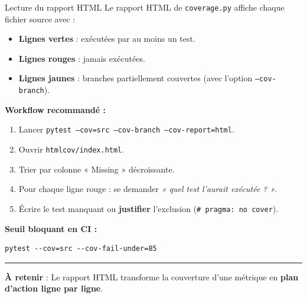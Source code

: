 \documentclass[aspectratio=169,11pt]{beamer}
\newcommand{\takeaway}[1]{%
\vfill\begin{beamercolorbox}[wd=\linewidth,sep=0.4em]{}
\color{accent2}\rule[0.6ex]{1.2em}{1.2pt}\hspace{0.4em}%
\textbf{\color{accent2}\small À retenir} \textcolor{textsoft}{:} %
{\small\color{textmain}#1}
\end{beamercolorbox}}
\begin{document}
\begin{frame}[fragile,t,shrink=12]{Lecture du rapport HTML}
\footnotesize
Le rapport HTML de \texttt{coverage.py} affiche chaque fichier source avec :\\[0.4em]
\begin{itemize}\itemsep0.15em
\item \textcolor{good}{\textbf{Lignes vertes}} : exécutées par au moins un test.
\item \textcolor{bad}{\textbf{Lignes rouges}} : jamais exécutées.
\item \textcolor{warn}{\textbf{Lignes jaunes}} : branches partiellement couvertes (avec l'option \texttt{--cov-branch}).
\end{itemize}
\vspace{0.4cm}
\textbf{Workflow recommandé :}\\[0.2em]
\begin{enumerate}\itemsep0.1em
\item Lancer \texttt{pytest --cov=src --cov-branch --cov-report=html}.
\item Ouvrir \texttt{htmlcov/index.html}.
\item Trier par colonne « Missing » décroissante.
\item Pour chaque ligne rouge : se demander \textit{« quel test l'aurait exécutée ? »}.
\item Écrire le test manquant ou \textbf{justifier} l'exclusion (\texttt{\# pragma: no cover}).
\end{enumerate}
\vspace{0.3cm}
\textbf{Seuil bloquant en CI :}
\begin{lstlisting}[style=bashdark]
pytest --cov=src --cov-fail-under=85
\end{lstlisting}
\takeaway{Le rapport HTML transforme la couverture d'une métrique en \textbf{plan d'action ligne par ligne}.}
\end{frame}
\end{document}
